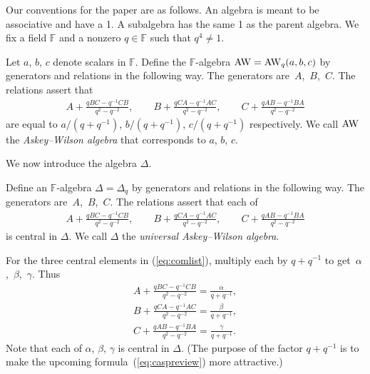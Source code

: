 \documentclass[pdftex]{sigma}
\numberwithin{equation}{section}
\begin{document}
Our conventions for the paper are as follows.
An algebra is meant to be associative and have a 1.
A subalgebra has the same 1 as the parent algebra.
We f\/ix a f\/ield $\mathbb F$
and  a nonzero $q \in \mathbb F$ such that $q^4\not=1$.

\begin{Definition}
\label{def:aw3}
Let $a$, $b$, $c$ denote scalars in $\mathbb F$.
Def\/ine the $\mathbb F$-algebra ${\rm AW}={\rm AW}_q(a,b,c)$
 by generators and relations in the following way.
The generators are~$A$,~$B$,~$C$.
The relations assert that
\begin{gather*}
 A+ \frac{qBC-q^{-1}CB}{q^2-q^{-2}},
\qquad B+
\frac{qCA-q^{-1}AC}{q^2-q^{-2}},
\qquad
C+
\frac{qAB-q^{-1}BA}{q^2-q^{-2}}
\end{gather*}
are equal to
$
a/(q+q^{-1})$,
$b/(q+q^{-1})$,
$c /(q+q^{-1})$
respectively. We call ${\rm AW}$ the
{\it Askey--Wilson algebra} that corresponds to
$a$, $b$, $c$.
\end{Definition}

 We now introduce the algebra $\Delta$.

\begin{Definition}
\label{def:uaw}
Def\/ine an $\mathbb F$-algebra
$\Delta=\Delta_q$
 by generators and relations in the following way.
The generators are~$A$,~$B$,~$C$.
The relations assert that each of
\begin{gather}
 A+ \frac{qBC-q^{-1}CB}{q^2-q^{-2}},
\qquad B+
\frac{qCA-q^{-1}AC}{q^2-q^{-2}},
\qquad
C+
\frac{qAB-q^{-1}BA}{q^2-q^{-2}}
\label{eq:comlist}
\end{gather}
is central in $\Delta$.
We call $\Delta$ the {\it universal Askey--Wilson algebra}.
\end{Definition}





\begin{Definition}
\label{def:abc}
\rm
For the
three central elements in
(\ref{eq:comlist}), multiply each by $q+q^{-1}$ to get~$\alpha$,~$\beta$,~$\gamma$. Thus
\begin{gather}
A+ \frac{qBC-q^{-1}CB}{q^2-q^{-2}}
=
\frac{\alpha}{q+q^{-1}},
\label{eq:u1}
\\
B+
\frac{qCA-q^{-1}AC}{q^2-q^{-2}}
=
\frac{\beta}{q+q^{-1}},
\label{eq:u2}
\\
C+
\frac{qAB-q^{-1}BA}{q^2-q^{-2}}
=
\frac{\gamma}{q+q^{-1}}.
\label{eq:u3}
\end{gather}
Note that each of $\alpha$, $\beta$, $\gamma$ is central in
$\Delta$.
(The purpose of the factor $q+q^{-1}$ is
to make the upcoming formula~(\ref{eq:caspreview})
more attractive.)
\end{Definition}
\end{document}
